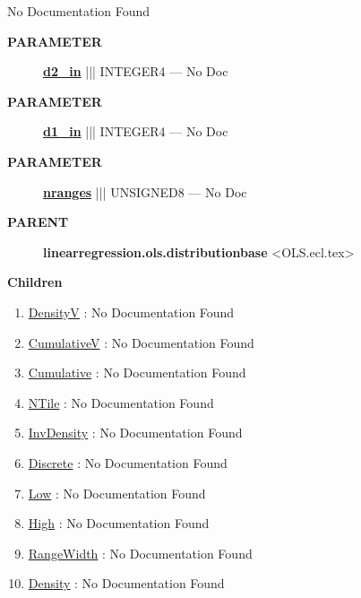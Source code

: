 \par





No Documentation Found






\par
\begin{description}
\item [\colorbox{tagtype}{\color{white} \textbf{\textsf{PARAMETER}}}] \textbf{\underline{d2\_in}} ||| INTEGER4 --- No Doc
\item [\colorbox{tagtype}{\color{white} \textbf{\textsf{PARAMETER}}}] \textbf{\underline{d1\_in}} ||| INTEGER4 --- No Doc
\item [\colorbox{tagtype}{\color{white} \textbf{\textsf{PARAMETER}}}] \textbf{\underline{nranges}} ||| UNSIGNED8 --- No Doc
\end{description}









\par
\begin{description}
\item [\colorbox{tagtype}{\color{white} \textbf{\textsf{PARENT}}}] \textbf{linearregression.ols.distributionbase} <OLS.ecl.tex>
\end{description}


\textbf{Children}
\begin{enumerate}
\item \hyperlink{ecldoc:linearregression.ols.distributionbase.densityv}{DensityV}
: No Documentation Found
\item \hyperlink{ecldoc:linearregression.ols.distributionbase.cumulativev}{CumulativeV}
: No Documentation Found
\item \hyperlink{ecldoc:linearregression.ols.distributionbase.cumulative}{Cumulative}
: No Documentation Found
\item \hyperlink{ecldoc:linearregression.ols.distributionbase.ntile}{NTile}
: No Documentation Found
\item \hyperlink{ecldoc:linearregression.ols.distributionbase.invdensity}{InvDensity}
: No Documentation Found
\item \hyperlink{ecldoc:linearregression.ols.distributionbase.discrete}{Discrete}
: No Documentation Found
\item \hyperlink{ecldoc:linearregression.ols.fdistribution.low}{Low}
: No Documentation Found
\item \hyperlink{ecldoc:linearregression.ols.fdistribution.high}{High}
: No Documentation Found
\item \hyperlink{ecldoc:linearregression.ols.fdistribution.rangewidth}{RangeWidth}
: No Documentation Found
\item \hyperlink{ecldoc:linearregression.ols.fdistribution.density}{Density}
: No Documentation Found
\end{enumerate}

